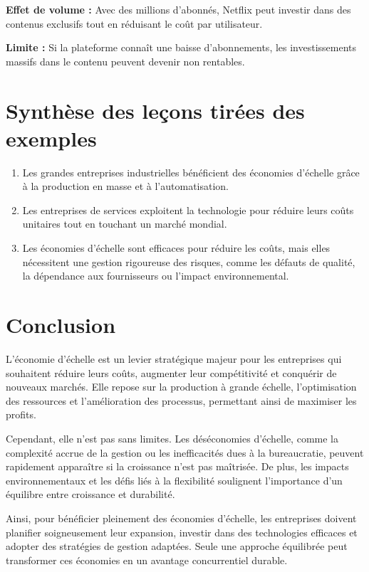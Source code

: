 \textbf{Effet de volume :}
Avec des millions d’abonnés, Netflix peut investir dans des contenus exclusifs tout en réduisant le coût par utilisateur.

\textbf{Limite :}
Si la plateforme connaît une baisse d’abonnements, les investissements massifs dans le contenu peuvent devenir non rentables.

\section{Synthèse des leçons tirées des exemples}
\begin{enumerate}
  \item Les grandes entreprises industrielles bénéficient des économies d’échelle grâce
        à la production en masse et à l’automatisation.
  \item Les entreprises de services exploitent la technologie pour réduire leurs coûts
        unitaires tout en touchant un marché mondial.
  \item Les économies d’échelle sont efficaces pour réduire les coûts, mais elles
        nécessitent une gestion rigoureuse des risques, comme les défauts de qualité,
        la dépendance aux fournisseurs ou l’impact environnemental.
\end{enumerate}

\section{Conclusion}
L’économie d’échelle est un levier stratégique majeur pour les entreprises qui
souhaitent réduire leurs coûts, augmenter leur compétitivité et conquérir de
nouveaux marchés. Elle repose sur la production à grande échelle,
l’optimisation des ressources et l’amélioration des processus, permettant ainsi
de maximiser les profits.

Cependant, elle n’est pas sans limites. Les déséconomies d’échelle, comme la
complexité accrue de la gestion ou les inefficacités dues à la bureaucratie,
peuvent rapidement apparaître si la croissance n’est pas maîtrisée. De plus,
les impacts environnementaux et les défis liés à la flexibilité soulignent
l’importance d’un équilibre entre croissance et durabilité.

Ainsi, pour bénéficier pleinement des économies d’échelle, les entreprises
doivent planifier soigneusement leur expansion, investir dans des technologies
efficaces et adopter des stratégies de gestion adaptées. Seule une approche
équilibrée peut transformer ces économies en un avantage concurrentiel durable.
